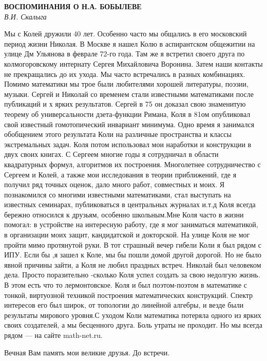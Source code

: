 \begin{center}{ \bf  ВОСПОМИНАНИЯ О Н.А. БОБЫЛЕВЕ}\\
{\it В.И. Скалыга} \\
\end{center}
Мы с Колей дружили 40 лет. Особенно часто мы общались в его московский период жизни Николая. В Москве я нашел Колю в аспирантском общежитии на улице Дм Ульянова в феврале 72-го  года. Там же   я встретил   своего друга по колмогоровскому интернату Сергея  Михайловича Воронина. Затем наши контакты не прекращались до их ухода. Мы часто встречались в разных комбинациях. Помимо математики мы трое были любителями хорошей литературы, поэзии, музыки. Сергей и Николай со временем стали  известными математиками после публикаций и  х ярких результатов. Сергей в 75 он  доказал свою знаменитую теорему об универсальности дзета-функции Римана, Коля  в  81ом опубликовал свой известный гомотопический инвариант минимума. Одно время я занимался обобщением этого результата Коли на различные   пространства  и классы экстремальных задач. Коля потом использовал мои наработки и конструкции в двух своих книгах. С Сергеем многие годы я сотрудничал в области квадратурных формул, алгоритмов их построения. Многолетнее сотрудничество с Сергеем и Колей, а также мои исследования в теории приближений, где я получил ряд точных оценок, дало много работ, совместных и моих. Я познакомился со многими известными математиками, стал выступать на известных семинарах, публиковаться в центральных журналах и.т.д Коля всегда бережно относился к друзьям, особенно школьным.Мне Коля часто в жизни помогал: в  устройстве на интересную работу, где я мог заниматься математикой, в организации  моих защит, кандидатской и докторской. На улице Коля не мог пройти мимо протянутой руки. В тот страшный вечер гибели  Коли я был рядом с ИПУ.  Если бы ,я зашел к Коле, мы бы пошли домой другой дорогой. Но не было явной причины зайти, а Коля не любил праздных встреч. Николай был человеком дела. Просто поразительно -сколько Коля успел создать за свою недолгую жизнь. В  этом есть что то лермонтовское. Коля и был поэтом-поэтом в математике с  тонкой, виртуозной техникой построения математических конструкций. Спектр интересов его был широк, от топологии до линейной алгебры, и везде были результаты  мирового уровня.С уходом Коли математика потеряла одного из ярких своих создателей, а мы бесценного друга. Боль утраты не проходит. Но мы  всегда рядом --- на сайте  math-net.ru.

Вечная Вам память мои великие друзья.   До встречи.


